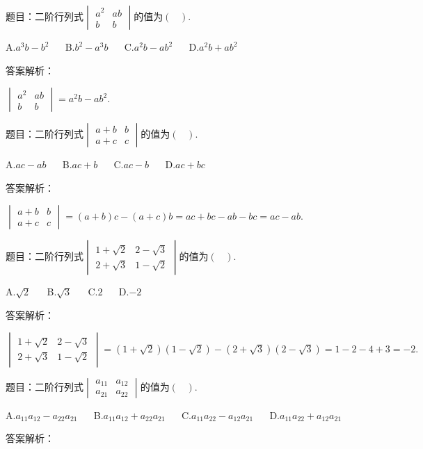 题目：$\mathrm{二阶行列式}\begin{vmatrix}a^2&ab\\b&b\end{vmatrix}\mathrm{的值为}(\;\;\;).$

A.$a^3b-b^2$ $\quad$ B.$b^2-a^3b$ $\quad$ C.$a^2b-ab^2$ $\quad$ D.$a^2b+ab^2$

答案解析：

$\begin{vmatrix}a^2&ab\\b&b\end{vmatrix}=a^2b-ab^2.$



题目：$\mathrm{二阶行列式}\begin{vmatrix}a+b&b\\a+c&c\end{vmatrix}\mathrm{的值为}(\;\;\;).$

A.$ac-ab$ $\quad$ B.$ac+b$ $\quad$ C.$ac-b$ $\quad$ D.$ac+bc$

答案解析：

$\begin{vmatrix}a+b&b\\a+c&c\end{vmatrix}=(a+b)c-(a+c)b=ac+bc-ab-bc=ac-ab.$



题目：$\mathrm{二阶行列式}\begin{vmatrix}1+\sqrt2&2-\sqrt3\\2+\sqrt3&1-\sqrt2\end{vmatrix}\mathrm{的值为}(\;\;\;).$

A.$\sqrt2$ $\quad$ B.$\sqrt3$ $\quad$ C.$2$ $\quad$ D.$-2$

答案解析：

$\begin{vmatrix}1+\sqrt2&2-\sqrt3\\2+\sqrt3&1-\sqrt2\end{vmatrix}=(1+\sqrt2)(1-\sqrt2)-(2+\sqrt3)(2-\sqrt3)=1-2-4+3=-2.$



题目：$\mathrm{二阶行列式}\begin{vmatrix}a_{11}&a_{12}\\a_{21}&a_{22}\end{vmatrix}\mathrm{的值为}(\;\;\;).$

A.$a_{11}a_{12}-a_{22}a_{21}$ $\quad$ B.$a_{11}a_{12}+a_{22}a_{21}$ $\quad$ C.$a_{11}a_{22}-a_{12}a_{21}$ $\quad$ D.$a_{11}a_{22}+a_{12}a_{21}$

答案解析：

